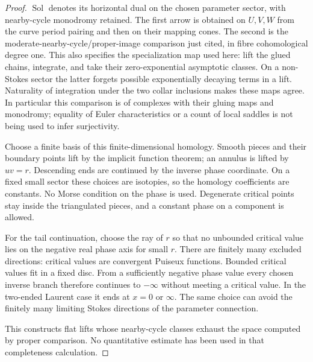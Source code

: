 \begin{proof}
$\operatorname{Sol}$ denotes its horizontal dual on the chosen
parameter sector, with nearby-cycle monodromy retained. The first arrow
is obtained on $U,V,W$ from the curve period pairing and then on their
mapping cones. The second is the moderate-nearby-cycle/proper-image
comparison just cited, in fibre cohomological degree one. This also
specifies the specialization map used here: lift the glued chains,
integrate, and take their zero-exponential asymptotic classes. On a
non-Stokes sector the latter forgets possible exponentially decaying
terms in a lift. Naturality of integration under the two collar
inclusions makes these maps agree. In particular this comparison is of
complexes with their gluing maps and monodromy; equality of Euler
characteristics or a count of local saddles is not being used to infer
surjectivity.

Choose a finite basis of this finite-dimensional homology. Smooth
pieces and their boundary points lift by the implicit function
theorem; an annulus is lifted by $uv=r$. Descending ends are continued
by the inverse phase coordinate. On a fixed small sector these choices
are isotopies, so the homology coefficients are constants. No Morse
condition on the phase is used. Degenerate critical points stay
inside the triangulated pieces, and a constant phase on a component
is allowed.

For the tail continuation, choose the ray of $r$ so that no unbounded
critical value lies on the negative real phase axis for small $r$.
There are finitely many excluded directions: critical values are
convergent Puiseux functions. Bounded critical values fit in a fixed
disc. From a sufficiently negative phase value every chosen inverse
branch therefore continues to $-\infty$ without meeting a critical
value. In the two-ended Laurent case it ends at $x=0$ or $\infty$.
The same choice can avoid the finitely many limiting Stokes directions
of the parameter connection.

This constructs flat lifts whose nearby-cycle classes exhaust the
space computed by proper comparison. No quantitative estimate has
been used in that completeness calculation.
\end{proof}

